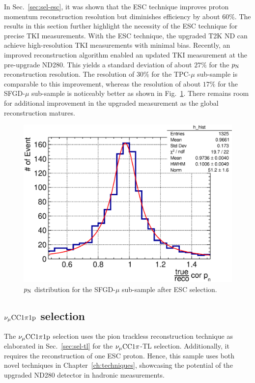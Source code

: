      In Sec.~\ref{sec:sel-esc}, it was shown that the ESC technique improves proton momentum reconstruction resolution but diminishes efficiency by about $60\%$.
     The results in this section further highlight the necessity of the ESC technique for precise TKI measurements.
     With the ESC technique, the upgraded T2K ND can achieve high-resolution TKI measurements with minimal bias.
     Recently, an improved reconstruction algorithm enabled an updated TKI measurement at the pre-upgrade ND280.
     This yields a standard deviation of about $27\%$ for the $p_\textrm{N}$ reconstruction resolution.
     The resolution of $30\%$ for the TPC-$\mu$ sub-sample is comparable to this improvement, whereas the resolution of about $17\%$ for the SFGD-$\mu$ sub-sample is noticeably better as shown in Fig.~\ref{fig:sfgmu-0pi-pn}.
     There remains room for additional improvement in the upgraded measurement as the global reconstruction matures.
     \begin{figure}
          \centering
          \includegraphics[width=\sgfigwid\textwidth]{figures/perf/tki/cor_pn_rat_hist_al11_sfgmu.eps}
          \caption{\label{fig:sfgmu-0pi-pn} $p_\textrm{N}$ distribution for the SFGD-$\mu$ sub-sample after ESC selection.}
     \end{figure}

     \subsection{$\nu_{\mu}\textrm{CC}1\pi1\textrm{p}$ selection}
     \label{sec:mc-tki-1pi}
     The $\nu_{\mu}\textrm{CC}1\pi1\textrm{p}$ selection uses the pion trackless reconstruction technique as elaborated in Sec.~\ref{sec:sel-tl} for the $\nu_{\mu}\textrm{CC}1\pi$-TL selection.
     Additionally, it requires the reconstruction of one ESC proton.
     Hence, this sample uses both novel techniques in Chapter~\ref{ch:techniques}, showcasing the potential of the upgraded ND280 detector in hadronic measurements.

